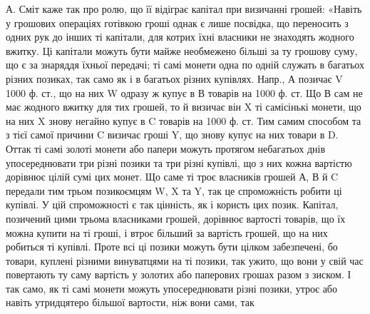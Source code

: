 А. Сміт каже так про ролю, що її відіграє капітал при визичанні грошей:
«Навіть у грошових операціях готівкою гроші однак є лише посвідка, що переносить
з одних рук до інших ті капітали, для котрих їхні власники не знаходять
жодного вжитку. Ці капітали можуть бути майже необмежено більші за ту
грошову суму, що є за знаряддя їхньої передачі; ті самі монети одна по одній
служать в багатьох різних позиках, так само як і в багатьох різних купівлях.
Напр., А позичає V 1000 ф. ст., що на них W одразу ж купує в В товарів
на 1000 ф. ст. Що В сам не має жодного вжитку для тих грошей, то й визичає
він X ті самісінькі монети, що на них X знову негайно купує в C товарів
на 1000 ф. ст. Тим самим способом та з тієї самої причини C визичає гроші
Y, що знову купує на них товари в D. Оттак ті самі золоті монети або папери
можуть протягом небагатьох днів упосереднювати три різні позики та три різні
купівлі, що з них кожна вартістю дорівнює цілій сумі цих монет. Що саме ті троє
власників грошей А, В й C передали тим трьом позикоємцям W, X та Y, так це
спроможність робити ці купівлі. У цій спроможності є так цінність, як і користь цих
позик. Капітал, позичений цими трьома власниками грошей, дорівнює вартості
товарів, що їх можна купити на ті гроші, і втроє більший за вартість грошей,
що на них робиться ті купівлі. Проте всі ці позики можуть бути цілком забезпечені,
бо товари, куплені різними винуватцями на ті позики, так ужито, що
вони у свій час повертають ту саму вартість у золотих або паперових грошах
разом з зиском. І так само, як ті самі монети можуть упосереднювати різні позики,
утроє або навіть утридцятеро більшої вартости, ніж вони сами, так
\parbreak{}  %
